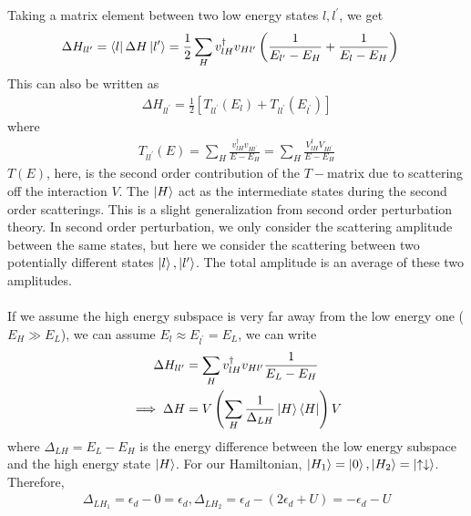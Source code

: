 \documentclass[twoside]{report}
\numberwithin{equation}{section}
\begin{document}
Taking a matrix element between two low energy states \(l, l^\prime\), we get
\begin{equation}\begin{aligned}
	\Delta H_{ll^\prime} = \bra{l} \Delta H \ket{l^\prime} &= \frac{1}{2}\sum_H v^\dagger_{lH}v_{Hl^\prime}\left(\frac{1}{E_{l^\prime} - E_H}+\frac{1}{E_l - E_H}\right)
\end{aligned}\end{equation}
This can also be written as
\begin{equation}\begin{aligned}
	\label{hamtmat}
	\Delta H_{ll^\prime} = \frac{1}{2}\left[T_{ll^\prime}(E_l) + T_{ll^\prime}(E_{l^\prime})\right]
\end{aligned}\end{equation}
where 
\begin{equation}\begin{aligned}
T_{ll^\prime}(E) = \sum_H \frac{v^\dagger_{lH}v_{Hl^\prime}}{E-E_H} = \sum_H \frac{V^\dagger_{lH} V_{Hl^\prime}}{E-E_H}
\end{aligned}\end{equation}
\(T(E)\), here, is the second order contribution of the \(T-\)matrix due to scattering off the interaction \(V\).
The \(\ket{H}\) act as the intermediate states during the second order scatterings.
This is a slight generalization from second order perturbation theory.
In second order perturbation, we only consider the scattering amplitude between the same states, but here we consider the scattering between two potentially different states \(\ket{l},\ket{l^\prime}\).
The total amplitude is an average of these two amplitudes.
\\\\If we assume the high energy subspace is very far away from the low energy one (\(E_H \gg E_L\)), we can assume \(E_l \approx E_{l^\prime} = E_L\), we can write
\begin{equation}\begin{aligned}
\Delta H_{ll^\prime} &=\sum_H v^\dagger_{lH}v_{Hl^\prime}\frac{1}{E_L-E_H}\\
\implies \Delta H &=V \left(\sum_H \frac{1}{\Delta_{LH}}\ket{H}\bra{H}\right)V
\end{aligned}\end{equation}
where \(\Delta_{LH}=E_L - E_H\) is the energy difference between the low energy subspace and the high energy state \(\ket{H}\).
For our Hamiltonian, \(\ket{H_1} = \ket{0}, \ket{H_2} = \ket{\uparrow\downarrow}\).
Therefore,
\begin{equation}\begin{aligned}
	\Delta_{LH_1} = \epsilon_d - 0 = \epsilon_d, \Delta_{LH_2} = \epsilon_d - \left(2\epsilon_d + U\right) = -\epsilon_d - U
\end{aligned}\end{equation}
\end{document}
